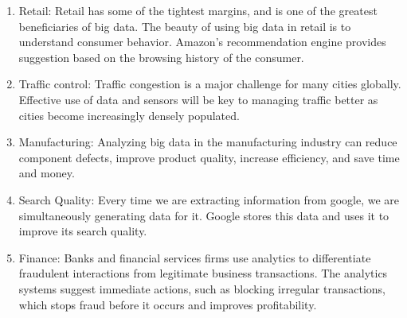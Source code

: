 \begin{enumerate}
    \item Retail: Retail has some of the tightest margins, and is one of the greatest beneficiaries of big data. The beauty of using big data in retail is to understand consumer behavior. Amazon’s recommendation engine provides suggestion based on the browsing history of the consumer.
    \item Traffic control: Traffic congestion is a major challenge for many cities globally. Effective use of data and sensors will be key to managing traffic better as cities become increasingly densely populated.
    \item Manufacturing: Analyzing big data in the manufacturing industry can reduce component defects, improve product quality, increase efficiency, and save time and money.
    \item Search Quality: Every time we are extracting information from google, we are simultaneously generating data for it. Google stores this data and uses it to improve its search quality.
    \item Finance: Banks and financial services firms use analytics to differentiate fraudulent interactions from legitimate business transactions. The analytics systems suggest immediate actions, such as blocking irregular transactions, which stops fraud before it occurs and improves profitability. 
\end{enumerate}








